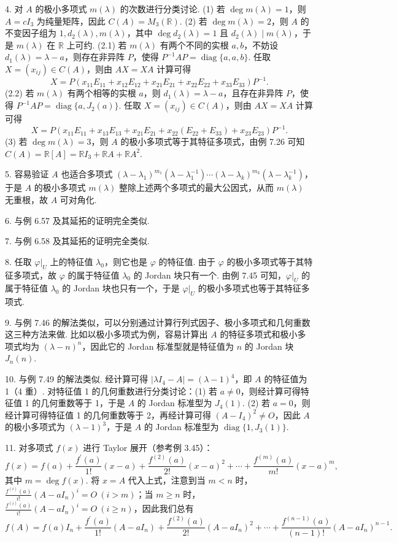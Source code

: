 \documentclass[UTF8, 12pt, fontset=fandol, oneside]{ctexart}
\begin{document}
4. 对 $A$ 的极小多项式 $m(\lambda)$ 的次数进行分类讨论. (1) 若 $\deg m(\lambda)=1$，则 $A=cI_3$ 为纯量矩阵，因此 $C(A)=M_3(\mathbb{R})$. (2) 若 $\deg m(\lambda)=2$，则 $A$ 的不变因子组为 $1,d_2(\lambda),m(\lambda)$，其中 $\deg d_2(\lambda)=1$ 且 $d_2(\lambda)\mid m(\lambda)$，于是 $m(\lambda)$ 在 $\mathbb{R}$ 上可约. (2.1) 若 $m(\lambda)$ 有两个不同的实根 $a,b$，不妨设 $d_1(\lambda)=\lambda-a$，则存在非异阵 $P$，使得 $P^{-1}AP=\operatorname{diag}\{a,a,b\}$. 任取 $X=(x_{ij})\in C(A)$，则由 $AX=XA$ 计算可得
\[
X=P(x_{11}E_{11}+x_{12}E_{12}+x_{21}E_{21}+x_{22}E_{22}+x_{33}E_{33})P^{-1}.
\]
(2.2) 若 $m(\lambda)$ 有两个相等的实根 $a$，则 $d_1(\lambda)=\lambda-a$，且存在非异阵 $P$，使得 $P^{-1}AP=\operatorname{diag}\{a,J_2(a)\}$. 任取 $X=(x_{ij})\in C(A)$，则由 $AX=XA$ 计算可得
\[
X=P(x_{11}E_{11}+x_{13}E_{13}+x_{21}E_{21}+x_{22}(E_{22}+E_{33})+x_{23}E_{23})P^{-1}.
\]
(3) 若 $\deg m(\lambda)=3$，则 $A$ 的极小多项式等于其特征多项式，由例 7.26 可知 $C(A)=\mathbb{R}[A]=\mathbb{R}I_3+\mathbb{R}A+\mathbb{R}A^2$.

5. 容易验证 $A$ 也适合多项式 $(\lambda-\lambda_1)^{m_1}(\lambda-\lambda_1^{-1})\cdots(\lambda-\lambda_k)^{m_k}(\lambda-\lambda_k^{-1})$，于是 $A$ 的极小多项式 $m(\lambda)$ 整除上述两个多项式的最大公因式，从而 $m(\lambda)$ 无重根，故 $A$ 可对角化.

6. 与例 6.57 及其延拓的证明完全类似.

7. 与例 6.58 及其延拓的证明完全类似.

8. 任取 $\varphi|_U$ 上的特征值 $\lambda_0$，则它也是 $\varphi$ 的特征值. 由于 $\varphi$ 的极小多项式等于其特征多项式，故 $\varphi$ 的属于特征值 $\lambda_0$ 的 Jordan 块只有一个. 由例 7.45 可知，$\varphi|_U$ 的属于特征值 $\lambda_0$ 的 Jordan 块也只有一个，于是 $\varphi|_U$ 的极小多项式也等于其特征多项式.

9. 与例 7.46 的解法类似，可以分别通过计算行列式因子、极小多项式和几何重数这三种方法来做. 比如以极小多项式为例，容易计算出 $A$ 的特征多项式和极小多项式均为 $(\lambda-n)^n$，因此它的 Jordan 标准型就是特征值为 $n$ 的 Jordan 块 $J_n(n)$.

10. 与例 7.49 的解法类似. 经计算可得 $|\lambda I_4-A|=(\lambda-1)^4$，即 $A$ 的特征值为 1（4 重）. 对特征值 1 的几何重数进行分类讨论：(1) 若 $a\ne0$，则经计算可得特征值 1 的几何重数等于 1，于是 $A$ 的 Jordan 标准型为 $J_4(1)$. (2) 若 $a=0$，则经计算可得特征值 1 的几何重数等于 2，再经计算可得 $(A-I_4)^2\ne O$，因此 $A$ 的极小多项式为 $(\lambda-1)^3$，于是 $A$ 的 Jordan 标准型为 $\operatorname{diag}\{1,J_3(1)\}$.

11. 对多项式 $f(x)$ 进行 Taylor 展开（参考例 3.45）：
\[
f(x)=f(a)+\frac{f^{\prime}(a)}{1!}(x-a)+\frac{f^{(2)}(a)}{2!}(x-a)^2+\cdots+\frac{f^{(m)}(a)}{m!}(x-a)^m,
\]
其中 $m=\deg f(x)$. 将 $x=A$ 代入上式，注意到当 $m<n$ 时，$\frac{f^{(i)}(a)}{i!}(A-aI_n)^i=O\ (i>m)$；当 $m\ge n$ 时，$\frac{f^{(i)}(a)}{i!}(A-aI_n)^i=O\ (i\ge n)$，因此我们总有
\[
f(A)=f(a)I_n+\frac{f^{\prime}(a)}{1!}(A-aI_n)+\frac{f^{(2)}(a)}{2!}(A-aI_n)^2+\cdots+\frac{f^{(n-1)}(a)}{(n-1)!}(A-aI_n)^{n-1}.
\]
\end{document}
